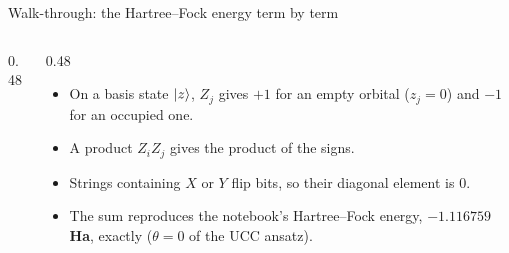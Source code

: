 \documentclass[aspectratio=169,11pt]{beamer}
\newcommand{\hl}[1]{{\color{qorange}\textbf{#1}}}
\begin{document}
\begin{frame}{Walk-through: the Hartree--Fock energy term by term}
  \begin{columns}[T]
    \begin{column}{0.48\textwidth}
      \scriptsize
      \begin{center}
      \end{center}
    \end{column}
    \begin{column}{0.48\textwidth}
      \begin{itemize}
        \item On a basis state $\ket{z}$, $Z_j$ gives $+1$ for an empty orbital ($z_j = 0$) and $-1$ for an occupied one.
        \item A product $Z_iZ_j$ gives the product of the signs.
        \item Strings containing $X$ or $Y$ flip bits, so their diagonal element is $0$.
        \item The sum reproduces the notebook's Hartree--Fock energy, \hl{$-1.116759$ Ha}, exactly ($\theta = 0$ of the UCC ansatz).
      \end{itemize}
    \end{column}
  \end{columns}
\end{frame}
\end{document}
